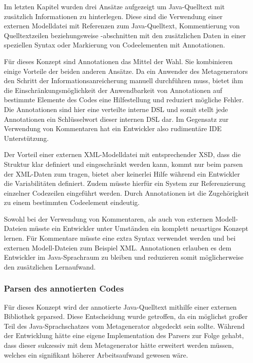 \documentclass[12pt,oneside,a4paper,parskip]{scrbook}
\begin{document}
Im letzten Kapitel wurden drei Ansätze aufgezeigt um Java-Quelltext mit zusätzlich Informationen zu hinterlegen. Diese sind die Verwendung einer externen Modelldatei mit Referenzen zum Java-Quelltext, Kommentierung von Quelltextzeilen beziehungsweise -abschnitten mit den zusätzlichen Daten in einer speziellen Syntax oder Markierung von Codeelementen mit Annotationen.

Für dieses Konzept sind Annotationen das Mittel der Wahl. Sie kombinieren einige Vorteile der beiden anderen Ansätze. Da ein Anwender des Metagenerators den Schritt der Informationsanreicherung manuell durchführen muss, bietet ihm die Einschränkungsmöglichkeit der Anwendbarkeit von Annotationen auf bestimmte Elemente des Codes eine Hilfestellung und reduziert mögliche Fehler. Die Annotationen sind hier eine verteilte interne DSL und somit stellt jede Annotationen ein Schlüsselwort dieser internen DSL dar. Im Gegensatz zur Verwendung von Kommentaren hat ein Entwickler also rudimentäre IDE Unterstützung. 

Der Vorteil einer externen XML-Modelldatei mit entsprechender XSD, dass die Struktur klar definiert und eingeschränkt werden kann, kommt nur beim parsen der XML-Daten zum tragen, bietet aber keinerlei Hilfe während ein Entwickler die Variabilitäten definiert. Zudem müsste hierfür ein System zur Referenzierung einzelner Codezeilen eingeführt werden. Durch Annotationen ist die Zugehörigkeit zu einem bestimmten Codeelement eindeutig.

Sowohl bei der Verwendung von Kommentaren, als auch von externen Modell-Dateien müsste ein Entwickler unter Umständen ein komplett neuartiges Konzept lernen. Für Kommentare müsste eine extra Syntax verwendet werden und bei externen Modell-Dateien zum Beispiel XML. Annotationen erlauben es dem Entwickler im Java-Sprachraum zu bleiben und reduzieren somit möglicherweise den zusätzlichen Lernaufwand.

\subsubsection{Parsen des annotierten Codes}

Für dieses Konzept wird der annotierte Java-Quelltext mithilfe einer externen Bibliothek geparsed. Diese Entscheidung wurde getroffen, da ein möglichst großer Teil des Java-Sprachschatzes vom Metagenerator abgedeckt sein sollte. Während der Entwicklung hätte eine eigene Implementation des Parsers zur Folge gehabt, dass dieser sukzessiv mit dem Metagenerator hätte erweitert werden müssen, welches ein signifikant höherer Arbeitsaufwand gewesen wäre.
\end{document}
